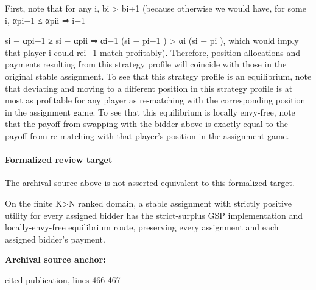 \documentclass[10pt]{article}
\begin{document}
\begin{ReviewVerbatim}
First, note that for any i, bi > bi+1 (because otherwise we would have, for some i, αpi−1
≤ αpii ⇒
i−1

si − αpi−1
≥ si − αpii ⇒ αi−1 (si − pi−1 ) > αi (si − pi ), which would imply that player i could rei−1
match profitably). Therefore, position allocations and payments resulting from this strategy profile
will coincide with those in the original stable assignment. To see that this strategy profile is an
equilibrium, note that deviating and moving to a different position in this strategy profile is at
most as profitable for any player as re-matching with the corresponding position in the assignment
game. To see that this equilibrium is locally envy-free, note that the payoff from swapping with
the bidder above is exactly equal to the payoff from re-matching with that player’s position in the
assignment game.
\end{ReviewVerbatim}


\paragraph{Formalized review target}
The archival source above is not asserted equivalent to this formalized target.
\begin{ReviewVerbatim}
On the finite K>N ranked domain, a stable assignment with strictly positive utility for every assigned bidder has the strict-surplus GSP implementation and locally-envy-free equilibrium route, preserving every assignment and each assigned bidder's payment.
\end{ReviewVerbatim}

\textbf{Archival source anchor:} {\footnotesize\raggedright cited publication, lines 466-\allowbreak{}467\par}
\end{document}
